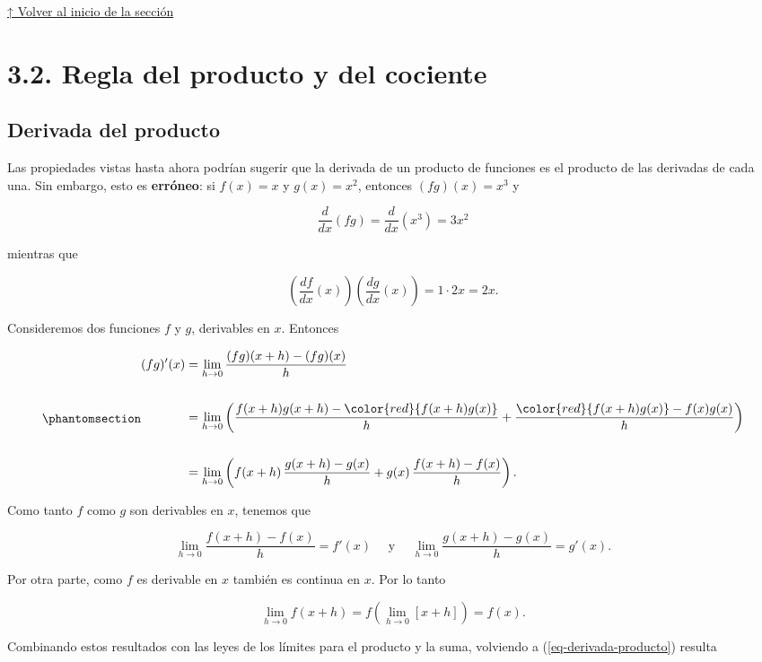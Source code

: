 \documentclass[
  letterpaper,
]{book}
\theoremstyle{plain}
\theoremstyle{remark}
\begin{document}
\hyperref[seccion_3.1]{↑ Volver al inicio de la sección}

\section{3.2. Regla del producto y del cociente}\label{seccion_3.2}

\subsection{Derivada del producto}\label{derivada-del-producto}

Las propiedades vistas hasta ahora podrían sugerir que la derivada de un
producto de funciones es el producto de las derivadas de cada una. Sin
embargo, esto es \textbf{erróneo}: si \(f(x)=x\) y \(g(x)=x^2\),
entonces \((fg)(x)=x^3\) y

\[
\frac{d}{dx}(fg)=\frac{d}{dx}(x^3)=3x^2
\]

mientras que

\[
\left(\frac{df}{dx}(x)\right)\left(\frac{dg}{dx}(x)\right)=1\cdot 2x=2x.
\]

Consideremos dos funciones \(f\) y \(g\), derivables en \(x\). Entonces

\begin{equation}\phantomsection\label{eq-derivada-producto}{
\begin{aligned}
(fg)'(x)&=\lim_{h\to 0}\frac{(fg)(x+h)-(fg)(x)}{h} \\
\\
&=\lim_{h\to 0}
\left(\frac{f(x+h)g(x+h)-\color{red}{f(x+h)g(x)}}{h}
+\frac{{\color{red}{f(x+h)g(x)}}-f(x)g(x)}{h}\right)\\
\\
&=\lim_{h\to 0}
\left(f(x+h)\,\frac{g(x+h)-g(x)}{h}
+g(x)\,\frac{f(x+h)-f(x)}{h}\right).
\end{aligned}
}\end{equation}

Como tanto \(f\) como \(g\) son derivables en \(x\), tenemos que

\[
\lim_{h\to 0}\frac{f(x+h)-f(x)}{h}=f'(x)\quad\text{ y }\quad \lim_{h\to 0}\frac{g(x+h)-g(x)}{h}=g'(x).
\]

Por otra parte, como \(f\) es derivable en \(x\) también es continua en
\(x\). Por lo tanto

\[
\lim_{h\to 0} f(x+h)=f\left(\lim_{h\to 0}[x+h]\right)=f(x).
\]

Combinando estos resultados con las leyes de los límites para el
producto y la suma, volviendo a (\ref{eq-derivada-producto}) resulta
\end{document}

